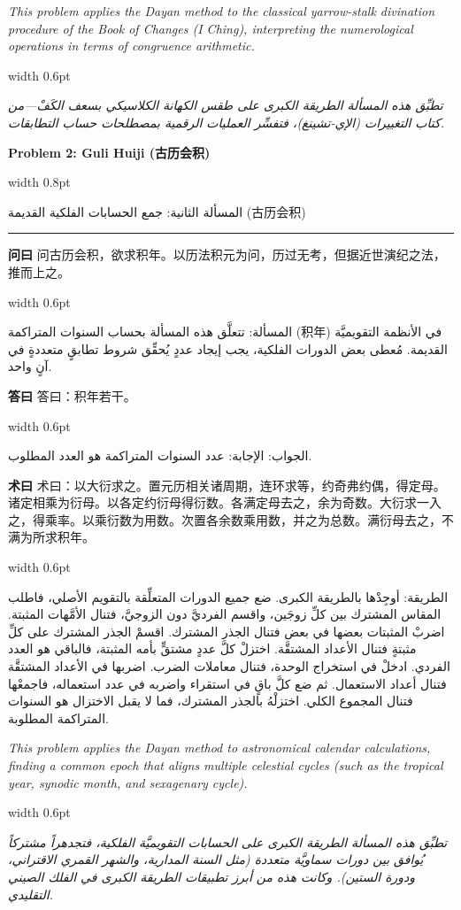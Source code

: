 \documentclass[11pt,a4paper]{article}
\newlength{\cnwidth}
\newlength{\arwidth}
\newcommand{\paralleltext}[2]{%
  \par\medskip\noindent
  \begin{minipage}[t]{\cnwidth}%
    \small #1%
  \end{minipage}%
  \hfill\textcolor{colrule}{\vrule width 0.6pt}\hfill
  \begin{minipage}[t]{\arwidth}%
    \small\arabicfont\beginR #2\endR%
  \end{minipage}%
  \par\medskip
}
\newcommand{\parallelsection}[2]{%
  \par\bigskip\noindent
  \begin{minipage}[t]{\cnwidth}%
    \Large\bfseries\color{sectioncolor} #1%
  \end{minipage}%
  \hfill\textcolor{colrule}{\vrule width 0.8pt}\hfill
  \begin{minipage}[t]{\arwidth}%
    \Large\arabicfontbf\color{sectioncolor}\beginR #2\endR%
  \end{minipage}%
  \par\medskip\noindent\textcolor{colrule}{\rule{\textwidth}{0.6pt}}\par\medskip
}
\newcommand{\cnlabel}[1]{\textbf{\color{notecolor}#1}}
\newcommand{\arlabel}[1]{\arabicfontbf\color{notecolor}\beginR #1\endR}
\begin{document}
\paralleltext{%
\textit{This problem applies the Dayan method to the classical yarrow-stalk divination procedure of the Book of Changes (I Ching), interpreting the numerological operations in terms of congruence arithmetic.}%
}{%
\textit{تطبِّق هذه المسألة الطريقة الكبرى على طقس الكهانة الكلاسيكي بسعف الكَفْ---من كتاب التغييرات (الإي-تشينغ)، فتفسِّر العمليات الرقمية بمصطلحات حساب التطابقات.}
}

\newpage

\parallelsection{Problem 2: Guli Huiji (古历会积)}{المسألة الثانية: جمع الحسابات الفلكية القديمة (古历会积)}

\paralleltext{%
\cnlabel{问曰} 问古历会积，欲求积年。以历法积元为问，历过无考，但据近世演纪之法，推而上之。%
}{%
\arlabel{المسألة:} تتعلَّق هذه المسألة بحساب السنوات المتراكمة (积年) في الأنظمة التقويميَّة القديمة. مُعطى بعض الدورات الفلكية، يجب إيجاد عددٍ يُحقِّق شروط تطابقٍ متعددةٍ في آنٍ واحد.
}

\paralleltext{%
\cnlabel{答曰} 答曰：积年若干。%
}{%
\arlabel{الجواب:} الإجابة: عدد السنوات المتراكمة هو العدد المطلوب.
}

\paralleltext{%
\cnlabel{术曰} 术曰：以大衍求之。置元历相关诸周期，连环求等，约奇弗约偶，得定母。诸定相乘为衍母。以各定约衍母得衍数。各满定母去之，余为奇数。大衍求一入之，得乘率。以乘衍数为用数。次置各余数乘用数，并之为总数。满衍母去之，不满为所求积年。%
}{%
\arlabel{الطريقة:} أوجِدْها بالطريقة الكبرى. ضع جميع الدورات المتعلِّقة بالتقويم الأصلي، فاطلب المقاس المشترك بين كلِّ زوجَين، واقسم الفرديَّ دون الزوجيَّ، فتنال الأمَّهات المثبتة. اضربْ المثبتات بعضها في بعض فتنال الجذر المشترك. اقسمْ الجذر المشترك على كلِّ مثبتةٍ فتنال الأعداد المشتقَّة. اختزلْ كلَّ عددٍ مشتقٍّ بأمه المثبتة، فالباقي هو العدد الفردي. ادخلْ في استخراج الوحدة، فتنال معاملات الضرب. اضربها في الأعداد المشتقَّة فتنال أعداد الاستعمال. ثم ضع كلَّ باقٍ في استقراء واضربه في عدد استعماله، فاجمعْها فتنال المجموع الكلي. اختزلْهُ بالجذر المشترك، فما لا يقبل الاختزال هو السنوات المتراكمة المطلوبة.
}

\paralleltext{%
\textit{This problem applies the Dayan method to astronomical calendar calculations, finding a common epoch that aligns multiple celestial cycles (such as the tropical year, synodic month, and sexagenary cycle).}%
}{%
\textit{تطبِّق هذه المسألة الطريقة الكبرى على الحسابات التقويميَّة الفلكية، فتجدهراً مشتركاً يُوافق بين دورات سماويَّة متعددة (مثل السنة المدارية، والشهر القمري الاقتراني، ودورة الستين). وكانت هذه من أبرز تطبيقات الطريقة الكبرى في الفلك الصيني التقليدي.}
}
\end{document}
